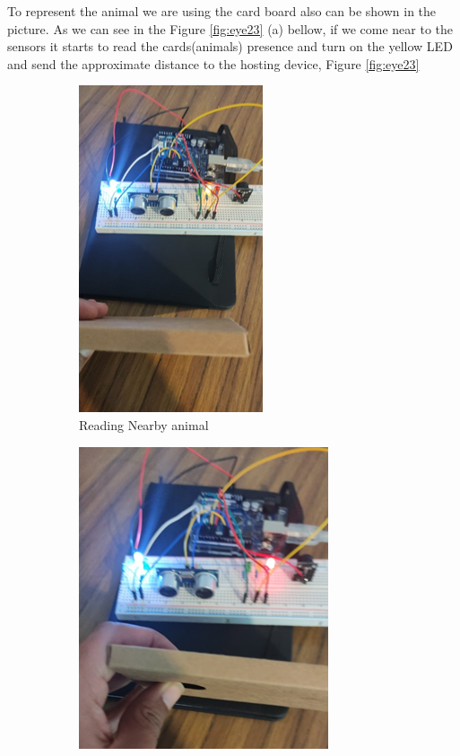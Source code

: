 \documentclass[12pt]{article}
\begin{document}
To represent the animal we are using the card board also can be shown in the picture. As we can see in the Figure \ref{fig:eye23} (a) bellow, if we come near to the sensors it starts to read the cards(animals) presence and turn on the yellow LED and send the approximate distance to the hosting device, Figure \ref{fig:eye23}

\begin{figure}[!h]
\begin{subfigure}{.5\textwidth}
  \includegraphics[width=.6\linewidth]{img/eye2.png}
  \caption{Reading Nearby animal}
  \label{fig:sub1}
\end{subfigure}%
\begin{subfigure}{.5\textwidth}
  \includegraphics[width=.6\linewidth]{img/eye4.png}

\end{subfigure}
\end{figure}
\end{document}
